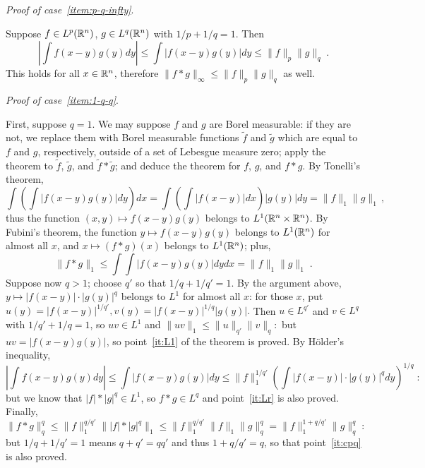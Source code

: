 \documentclass[12pt]{article}
\begin{document}
\textit{Proof of case~\ref{item:p-q-infty}}.

Suppose $f\in L^p(\mathbb{R}^n)$, $g\in L^q(\mathbb{R}^n)$ with $1/p+1/q=1$.
Then
\begin{displaymath}
\left|\int f(x-y)g(y)dy\right|
\leq\int|f(x-y)g(y)|dy
\leq\|f\|_p\|g\|_q\;.
\end{displaymath}
This holds for all $x\in\mathbb{R}^n$,
therefore
\begin{math}
\|f\ast g\|_\infty\leq\|f\|_p\|g\|_q
\end{math}
as well.

\textit{Proof of case~\ref{item:1-q-q}}.

First, suppose $q=1$.
We may suppose $f$ and $g$ are Borel measurable:
if they are not, we replace them with Borel measurable functions
$\tilde{f}$ and $\tilde{g}$
which are equal to $f$ and $g$, respectively,
outside of a set of Lebesgue measure zero;
apply the theorem to $\tilde{f}$, $\tilde{g}$, and $\tilde{f}\ast\tilde{g}$;
and deduce the theorem for $f$, $g$, and $f\ast g$.
By Tonelli's theorem,
\begin{displaymath}
\int\left(\int|f(x-y)g(y)|dy\right)dx
=\int\left(\int|f(x-y)|dx\right)|g(y)|dy
=\|f\|_1\|g\|_1\,,
\end{displaymath}
thus the function $(x,y)\mapsto f(x-y)g(y)$
belongs to $L^1(\mathbb{R}^n\times\mathbb{R}^n)$.
By Fubini's theorem,
the function $y\mapsto f(x-y)g(y)$
belongs to $L^1(\mathbb{R}^n)$ for almost all $x$,
and $x\mapsto(f\ast g)(x)$ belongs to $L^1(\mathbb{R}^n)$;
plus,
\begin{displaymath}
\|f\ast g\|_1
\leq\int\int|f(x-y)g(y)|dydx
=\|f\|_1\|g\|_1\;.
\end{displaymath}
Suppose now $q>1$;
choose $q'$ so that $1/q + 1/q' = 1$.
By the argument above,
\begin{math}
y \mapsto |f(x-y)| \cdot |g(y)|^q
\end{math}
belongs to $L^1$ for almost all $x$:
for those $x$, put
\begin{math}
u(y) = |f(x-y)|^{1/q'},
v(y) = |f(x-y)|^{1/q}|g(y)|.
\end{math}
Then $u \in L^{q'}$ and $v \in L^q$ with $1/q' + 1/q = 1$,
so $uv \in L^1$ and
\begin{math}
\|uv\|_1 \leq \|u\|_{q'}\|v\|_q :
\end{math}
but $uv = |f(x-y)g(y)|$, so point~\ref{it:L1} of the theorem is proved.
By H\"older's inequality,
\begin{displaymath}
\left| \int f(x-y)g(y)dy \right|
\leq
\int |f(x-y)g(y)| dy
\leq
\|f\|_1^{1/q'} \left( \int |f(x-y)| \cdot |g(y)|^q dy \right)^{1/q}
\;:
\end{displaymath}
but we know that $|f| \ast |g|^q \in L^1$,
so $f \ast g \in L^q$ and point~\ref{it:Lr} is also proved.
Finally,
\begin{displaymath}
\|f \ast g\|_q^q
\leq
\|f\|_1^{q/q'} \| |f| \ast |g|^q \|_1
\leq
\|f\|_1^{q/q'} \| f \|_1 \| g \|_q^q
=
\|f\|_1^{1+q/q'} \|g\|_q^q
\;:
\end{displaymath}
but $1/q + 1/q' = 1$ means $q+q' = qq'$ and thus $1+q/q' = q$,
so that point~\ref{it:cpq} is also proved.
\end{document}
